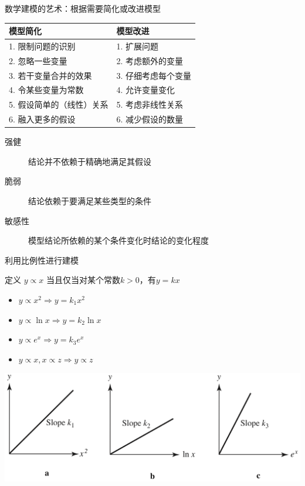 \documentclass[UTF8]{ctexbeamer}
\begin{document}
\begin{frame}{数学建模的艺术：根据需要简化或改进模型}

  \begin{table}[ht]
    \centering
    \begin{tabular}{ll}
      模型简化 & 模型改进\\
      \hline{}
      1. 限制问题的识别 & 1. 扩展问题\\
      2. 忽略一些变量 & 2. 考虑额外的变量\\
      3. 若干变量合并的效果 & 3. 仔细考虑每个变量\\
      4. 令某些变量为常数 & 4. 允许变量变化\\
      5. 假设简单的（线性）关系 & 5. 考虑非线性关系\\
      6. 融入更多的假设 & 6. 减少假设的数量
    \end{tabular}
  \end{table}

  \begin{description}
  \item[强健] 结论并不依赖于精确地满足其假设
  \item[脆弱] 结论依赖于要满足某些类型的条件
  \item[敏感性] 模型结论所依赖的某个条件变化时结论的变化程度
  \end{description}

\end{frame}

\begin{frame}{利用比例性进行建模}
  \begin{block}{定义}
    $y \propto x$ 当且仅当对某个常数$k>0$，有$y=kx$
  \end{block}

  \begin{itemize}
  \item $y \propto x^2 \Rightarrow y=k_1x^2$
  \item $y \propto \ln x \Rightarrow y=k_2\ln x$
  \item $y \propto e^x \Rightarrow y=k_3 e^x$
  \item $y \propto x, x \propto z \Rightarrow y \propto z$
  \end{itemize}

  \begin{center}
    \includegraphics[width=.6\textwidth{}]{proptofig.png}
  \end{center}
\end{frame}
\end{document}
